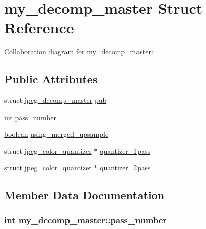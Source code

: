 \hypertarget{structmy__decomp__master}{}\section{my\+\_\+decomp\+\_\+master Struct Reference}
\label{structmy__decomp__master}


Collaboration diagram for my\+\_\+decomp\+\_\+master\+:
\subsection*{Public Attributes}
\begin{DoxyCompactItemize}
\item 
struct \hyperlink{structjpeg__decomp__master}{jpeg\+\_\+decomp\+\_\+master} \hyperlink{structmy__decomp__master_ab9a692c30b5f1cc03d9074ad3c69af3f}{pub}
\item 
int \hyperlink{structmy__decomp__master_a0870daa393b92584b4720171586074a1}{pass\+\_\+number}
\item 
\hyperlink{jmorecfg_8h_a7c6368b321bd9acd0149b030bb8275ed}{boolean} \hyperlink{structmy__decomp__master_af7ab207dfbf091b4de60e6fe3938f4a4}{using\+\_\+merged\+\_\+upsample}
\item 
struct \hyperlink{structjpeg__color__quantizer}{jpeg\+\_\+color\+\_\+quantizer} $\ast$ \hyperlink{structmy__decomp__master_af72048ba84933f931c09153470ff4f0b}{quantizer\+\_\+1pass}
\item 
struct \hyperlink{structjpeg__color__quantizer}{jpeg\+\_\+color\+\_\+quantizer} $\ast$ \hyperlink{structmy__decomp__master_a9a5f56ccbaec7d13e08e0cfb9d7a3974}{quantizer\+\_\+2pass}
\end{DoxyCompactItemize}


\subsection{Member Data Documentation}
\hypertarget{structmy__decomp__master_a0870daa393b92584b4720171586074a1}{}
\subsubsection[{pass\+\_\+number}]{\setlength{\rightskip}{0pt plus 5cm}int my\+\_\+decomp\+\_\+master\+::pass\+\_\+number}\label{structmy__decomp__master_a0870daa393b92584b4720171586074a1}
\hypertarget{structmy__decomp__master_ab9a692c30b5f1cc03d9074ad3c69af3f}{}
